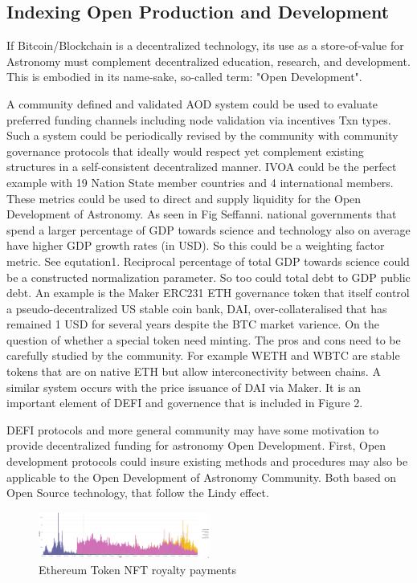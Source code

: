 \documentclass[final,5p,times,twocolumn,authoryear]{elsarticle}
\begin{document}
\subsection{Indexing Open Production and Development}

If Bitcoin/Blockchain is a decentralized technology, its use as a store-of-value for Astronomy must complement decentralized education, research, and development. This is embodied in its name-sake, so-called term: "Open Development".

A community defined and validated AOD system could be used to evaluate preferred funding channels including node validation via incentives Txn types. Such a system could be periodically revised by the community with community governance protocols that ideally would respect yet complement existing structures in a self-consistent decentralized manner. IVOA could be the perfect example with 19 Nation State member countries and 4 international members. These metrics could be used to direct and supply liquidity for the Open Development of Astronomy. As seen in Fig Seffanni. national governments that spend a larger percentage of GDP towards science and technology also on average have higher GDP growth rates (in USD). So this could be a weighting factor metric. See equtation1. Reciprocal percentage of total GDP towards science could be a constructed normalization parameter. So too could total debt to GDP public debt.  An example is the Maker ERC231 ETH governance token that itself control a  pseudo-decentralized US stable coin bank, DAI, over-collateralised that has remained 1 USD for several years despite the BTC market varience.  On the question of whether a special token need minting. The pros and cons need to be carefully studied by the community. For example WETH and WBTC are stable tokens that are on native ETH but allow interconectivity between chains. A similar system occurs with the price issuance of DAI via Maker. It is an important element of DEFI and governence that is included in Figure 2.   

DEFI protocols and more general community may have some motivation to provide decentralized funding for astronomy Open Development. First, Open development protocols could insure existing methods and procedures may also be applicable to the Open Development of Astronomy Community. Both  based on Open Source technology, that follow the Lindy effect.

 \begin{figure}
    \centering
    \includegraphics[width=0.5\textwidth]{figs/royalty_pay.jpg}
    \caption{Ethereum Token NFT royalty payments}
\end{figure}
\end{document}
